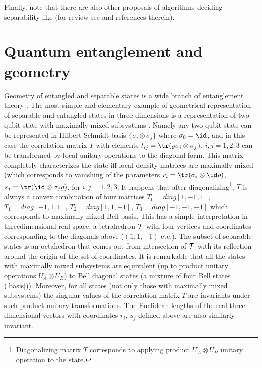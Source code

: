 \documentclass[twocolumn,aps,rmp]{revtex4}
\begin{document}
Finally, note that there are also other proposals of algorithms
deciding separability like \cite{ZapatrinAlgorithm} (for review see
\cite{IoannouAlgorithm3} and references therein).



\section{Quantum entanglement and geometry}
\label{sec:ent_geom}

Geometry of entangled and separable states is a wide branch of
entanglement theory \cite{BengtssonZyczkowski-book}. The most simple
and elementary example of geometrical representation of separable and
entangled states in three dimensions is a representation of two-qubit
state with maximally mixed subsystems \cite{MRH-PRA96}. Namely any
two-qubit state can be represented in Hilbert-Schmidt basis $\{
\sigma_{i} \otimes \sigma_{j}\}$ where $\sigma_{0}=\id$, and in this
case the correlation matrix $T$ with elements $t_{ij}={\tr}(\varrho
\sigma_{i} \otimes \sigma_{j})$, $i,j=1,2,3$ can be transformed by
local unitary operations to the diagonal form. This matrix completely
characterizes the state iff local density matrices are maximally mixed
(which corresponds to vanishing of the parameters
$r_{i}={\tr}(\sigma_{i} \otimes \id \varrho)$, $s_{j}={\tr}( \id
\otimes \sigma_{j} \varrho)$, for $i,j=1,2,3$. It happens that after
diagonalizing\footnote{Diagonalizing matrix $T$ corresponds to
  applying product $U_{A} \otimes U_{B}$ unitary operation to the
  state.}, $T$ is always a convex combination of four matrices
$T_{0}=diag[1,-1,1]$, $T_{1}=diag[-1,1,1]$, $T_{2}=diag[1,1,-1]$,
$T_{3}=diag[-1,-1,-1]$ which corresponds to maximally mixed Bell
basis. This has a simple interpretation in threedimensional real
space: a tetrahedron ${\cal T}$ with four vertices and coordinates
corresponding to the diagonals above ($(1,1,-1)$ etc.). The subset of
separable states is an octahedron that comes out from intersection of
${\cal T}$ with its reflection around the origin of the set of
coordinates. It is remarkable that all the states with maximally mixed
subsystems are equivalent (up to product unitary operations $U_{A}
\otimes U_{B}$) to Bell diagonal states (a mixture of four Bell states
(\ref{basis})).  Moreover, for all states (not only those with
maximally mixed subsystems) the singular values of the correlation
matrix $T$ are invariants under such product unitary
transformations. The Euclidean lengths of the real three-dimensional
vectors with coordinates $r_{i}$, $s_{j}$ defined above are also
similarly invariant.
\end{document}
